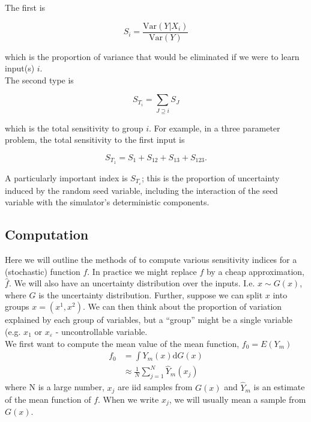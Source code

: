 \documentclass[12pt]{article}
\newcommand{\var}{\text{Var}}
\newcommand{\dd}{\text{d}}
\begin{document}
The first is 

\begin{equation}
	S_i = \frac{\var(Y|X_i)}{\var(Y)}
\end{equation}

which is the proportion of variance that would be eliminated if we were to learn input(s) $i$.\\

The second type is 

\begin{equation}
	S_{T_i} = \sum_{J \supseteq i} S_J 
\end{equation}

which is the total sensitivity to group $i$. For example, in a three parameter problem, the total sensitivity to the first input is

\begin{equation}
	S_{T_1} = S_1 + S_{12} + S_{13} + S_{123}.
\end{equation}

A particularly important index is $S_{T_\varepsilon}$; this is the proportion of uncertainty induced by the random seed variable, including the interaction of the seed variable with the simulator's deterministic components.
\subsection{Computation}

Here we will outline the methods of \citet{Sobol1993} to compute various sensitivity indices for a (stochastic) function $f$. In practice we might replace $f$ by a cheap approximation, $\hat{f}$. We will also have an uncertainty distribution over the inputs. I.e. $x \sim G(x)$, where $G$ is the uncertainty distribution. Further, suppose we can split $x$ into groups $x = (x^1, x^2)$. We can then think about the proportion of variation explained by each group of variables, but a ``group'' might be a single variable (e.g. $x_1$ or $x_\varepsilon$ - uncontrollable variable.\\

We first want to compute the mean value of the mean function, $f_0 = E(Y_m)$
\begin{align*}
f_0 & = \int Y_m(x) \dd G(x) \\
& \approx \frac{1}{N} \sum_{j = 1}^N \hat{Y}_m (x_j)
\end{align*}
where N is a large number, $x_j$ are iid samples from $G(x)$ and $\hat{Y}_m$ is an estimate of the mean function of $f$. When we write $x_j$, we will usually mean a sample from $G(x)$.\\
\end{document}
